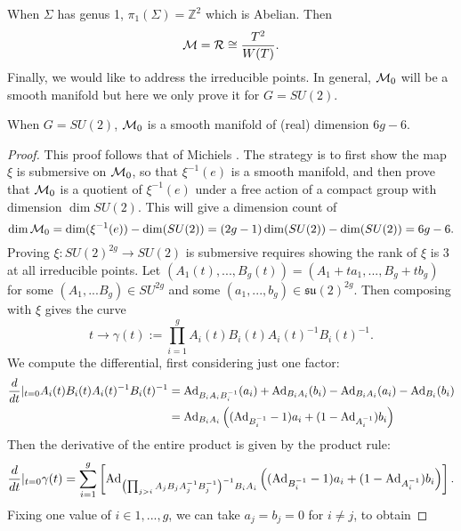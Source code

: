 	When $\Sigma$ has genus 1, $\pi_1(\Sigma) = \mathbb{Z}^2$ which is Abelian. Then
	\begin{equation}
		\mathcal{M} = \mathcal{R} \cong \frac{T^{2}}{W(T)}.
	\end{equation}
	Finally, we would like to address the irreducible points. In general, $\mathcal{M}_0$ will be a smooth manifold \cite[\S7]{atiyah_yang-mills_1983} but here we only prove it for $G=SU(2)$. 
	\begin{theorem}
		When $G=SU(2)$, $\mathcal{M}_0$ is a smooth manifold of (real) dimension $6g-6$.
	\end{theorem}
	\begin{proof}
		This proof follows that of Michiels \cite[Thm 96]{michiels_moduli_nodate}. The strategy is to first show the map $\xi$ is submersive on $\mathcal{M}_0$, so that $\xi^{-1}(e)$ is a smooth manifold, and then prove that $\mathcal{M}_0$ is a quotient of $\xi^{-1}(e)$ under a free action of a compact group with dimension $\dim SU(2)$. This will give a dimension count of
		\begin{equation}
			\dim \mathcal{M}_0 = \dim(\xi^{-1}(e)) - \dim(SU(2)) = (2g-1)\dim(SU(2)) - \dim(SU(2)) = 6g-6.
		\end{equation} 
		Proving $\xi:SU(2)^{2g} \to SU(2)$ is submersive requires showing the rank of $\xi$ is 3 at all irreducible points. Let $(A_1(t),...,B_g(t)) = (A_1 + ta_1,..., B_g + tb_g)$ for some $(A_1,...B_g) \in SU^{2g}$ and some $(a_1,...,b_g) \in \mathfrak{su}(2)^{2g}$. Then composing with $\xi$ gives the curve
		\begin{equation}
			t\to \gamma(t):= \prod_{i=1}^g A_i(t)B_i(t)A_i(t)^{-1}B_i(t)^{-1}.
		\end{equation}
		We compute the differential, first considering just one factor:
		\begin{align*}
			\frac{d}{dt}|_{t=0} A_i(t)B_i(t)A_i(t)^{-1}B_i(t)^{-1} &= \text{Ad}_{B_iA_iB_i^{-1}}(a_i) + \text{Ad}_{B_iA_i}(b_i) - \text{Ad}_{B_iA_i}(a_i) - \text{Ad}_{B_i}(b_i)\\
			&= \text{Ad}_{B_iA_i}\left(
			(\text{Ad}_{B_i^{-1}}-1)a_i + (1-\text{Ad}_{A_i^{-1}})b_i
			\right)
		\end{align*}
		Then the derivative of the entire product is given by the product rule:
		\begin{equation}
			\frac{d}{dt}|_{t=0} \gamma(t) = \sum_{i=1}^g \left[
			\text{Ad}_{\left(\prod_{j>i} A_jB_jA_j^{-1}B_j^{-1}\right)^{-1}B_iA_i} \left((\text{Ad}_{B_i^{-1}}-1)a_i + (1-\text{Ad}_{A_i^{-1}})b_i\right)
			\right].
		\end{equation}
		Fixing one value of $i\in {1,...,g}$, we can take $a_j = b_j =0$ for $i\neq j$, to obtain

\end{proof}
